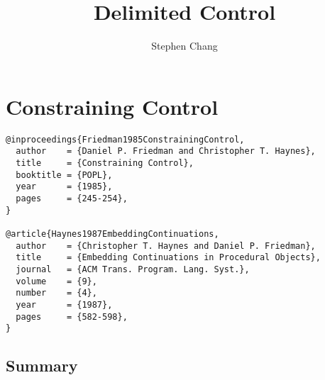 \documentclass[letterpaper]{llncs}
\begin{document}

\title{Delimited Control}
\author{Stephen Chang}
\maketitle

\section*{Constraining Control}%

\begin{verbatim}
@inproceedings{Friedman1985ConstrainingControl,
  author    = {Daniel P. Friedman and Christopher T. Haynes},
  title     = {Constraining Control},
  booktitle = {POPL},
  year      = {1985},
  pages     = {245-254},
}

@article{Haynes1987EmbeddingContinuations,
  author    = {Christopher T. Haynes and Daniel P. Friedman},
  title     = {Embedding Continuations in Procedural Objects},
  journal   = {ACM Trans. Program. Lang. Syst.},
  volume    = {9},
  number    = {4},
  year      = {1987},
  pages     = {582-598},
}
\end{verbatim}


\subsection*{Summary}
\end{document}
